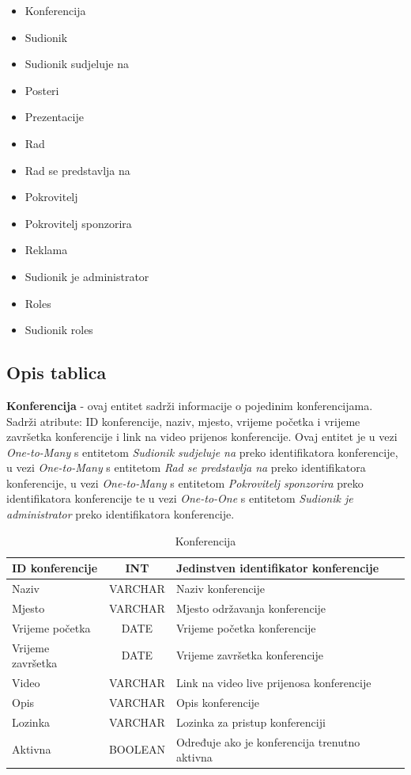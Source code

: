 \begin{itemize}
	\item Konferencija
	\item Sudionik
	\item Sudionik sudjeluje na
	\item Posteri
	\item Prezentacije
	\item Rad
	\item Rad se predstavlja na
	\item Pokrovitelj
	\item Pokrovitelj sponzorira
	\item Reklama
	\item Sudionik je administrator
	\item Roles
	\item Sudionik roles
\end{itemize}
		
			\subsection{Opis tablica}
			

\textbf{Konferencija} - ovaj entitet sadrži informacije o pojedinim konferencijama. Sadrži atribute: ID konferencije, naziv, mjesto, vrijeme početka i vrijeme završetka konferencije i link na video prijenos konferencije. Ovaj entitet je u vezi \textit{One-to-Many} s entitetom \textit{Sudionik sudjeluje na} preko identifikatora konferencije, u vezi \textit{One-to-Many} s entitetom \textit{Rad se predstavlja na} preko identifikatora konferencije, u vezi \textit{One-to-Many} s entitetom \textit{Pokrovitelj sponzorira} preko identifikatora konferencije te u vezi \textit{One-to-One} s entitetom \textit{Sudionik je administrator} preko identifikatora konferencije.

\begin{table}[H]
	\caption{Konferencija}
	\label{tbl:konferencija}
	\centering
	\begin{tabular}{|l|c|l|} 
		\hline
		\cellcolor{lightgreen}ID konferencije & INT & Jedinstven identifikator konferencije\\ 
		\hline
		Naziv & VARCHAR & Naziv konferencije\\ 
		\hline
		Mjesto & VARCHAR & Mjesto održavanja konferencije\\ 
		\hline
		Vrijeme početka & DATE & Vrijeme početka konferencije\\ 
		\hline
		Vrijeme završetka & DATE & Vrijeme završetka konferencije\\ 
		\hline
		Video & VARCHAR & Link na video live prijenosa konferencije\\ 
		\hline
		Opis & VARCHAR & Opis konferencije\\ 
		\hline
		Lozinka & VARCHAR & Lozinka za pristup konferenciji\\ 
		\hline
		Aktivna & BOOLEAN & Određuje ako je konferencija trenutno aktivna\\ 
		\hline
	\end{tabular}
\end{table}


